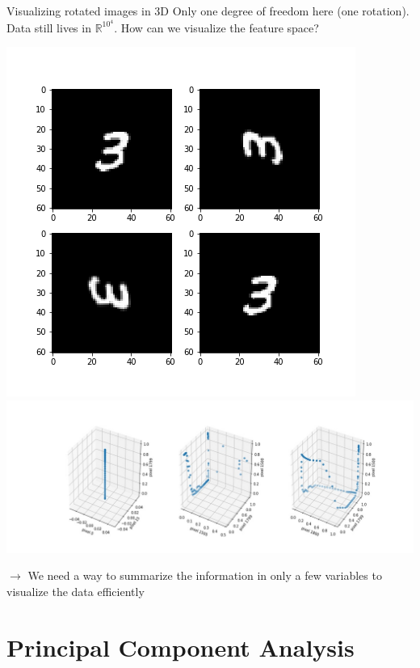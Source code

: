 \documentclass{beamer}
\begin{document}
\begin{frame}{Visualizing rotated images in 3D}
Only one degree of freedom here (one rotation).\\
Data still lives in $\mathbb{R}^{10^{4}}$. How can we visualize the feature space?
\begin{center}
\vspace{-0.4cm}
\includegraphics[scale=0.2]{rotated_3s.png}\\
\vspace{-0.35cm}
\includegraphics[scale=0.25]{scatterplots.jpg}\\
\end{center}
\vspace{-0.5cm}
$\rightarrow$ We need a way to summarize the information in only a few variables to visualize the data efficiently
\end{frame}

\section{Principal Component Analysis}
\end{document}
